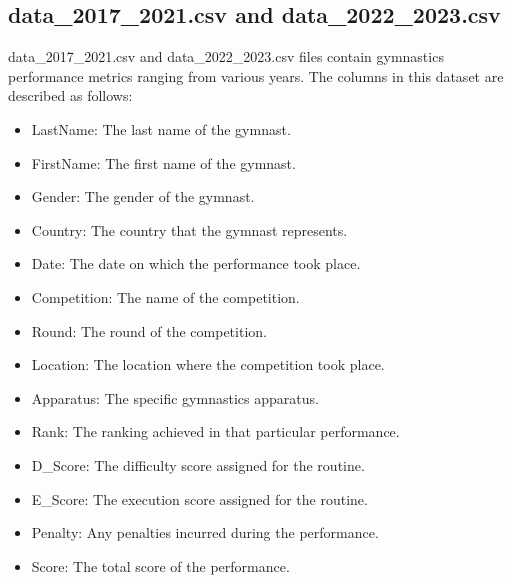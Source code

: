 \documentclass[11pt]{article}
\begin{document}
  \subsection{data\_2017\_2021.csv and data\_2022\_2023.csv}
        data\_2017\_2021.csv and data\_2022\_2023.csv   files contain gymnastics performance metrics ranging from various years. The columns in this dataset are described as follows:
        \begin{itemize}
            \item LastName: The last name of the gymnast.
            \item FirstName: The first name of the gymnast.
            \item Gender: The gender of the gymnast.
            \item Country: The country that the gymnast represents.
            \item Date: The date on which the performance took place.
            \item Competition: The name of the competition.
            \item Round: The round of the competition.
            \item Location: The location where the competition took place.
            \item Apparatus: The specific gymnastics apparatus.
            \item Rank: The ranking achieved in that particular performance.
            \item D\_Score: The difficulty score assigned for the routine.
            \item E\_Score: The execution score assigned for the routine.
            \item Penalty: Any penalties incurred during the performance.
            \item Score: The total score of the performance.
        \end{itemize}

        
\end{document}
